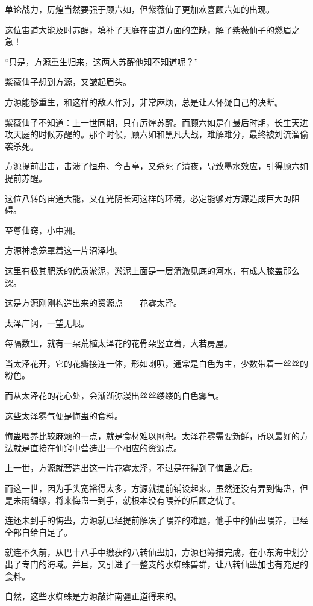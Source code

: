 \begin{this_body}
单论战力，厉煌当然要强于顾六如，但紫薇仙子更加欢喜顾六如的出现。

这位宙道大能及时苏醒，填补了天庭在宙道方面的空缺，解了紫薇仙子的燃眉之急！

“只是，方源重生归来，这两人苏醒他知不知道呢？”

紫薇仙子想到方源，又皱起眉头。

方源能够重生，和这样的敌人作对，非常麻烦，总是让人怀疑自己的决断。

紫薇仙子不知道：上一世同期，只有厉煌苏醒。而顾六如是在最后时期，长生天进攻天庭的时候苏醒的。那个时候，顾六如和黑凡大战，难解难分，最终被刘流溜偷袭杀死。

方源提前出击，击溃了恒舟、今古亭，又杀死了清夜，导致墨水效应，引得顾六如提前苏醒。

这位八转的宙道大能，又在光阴长河这样的环境，必定能够对方源造成巨大的阻碍。

至尊仙窍，小中洲。

方源神念笼罩着这一片沼泽地。

这里有极其肥沃的优质淤泥，淤泥上面是一层清澈见底的河水，有成人膝盖那么深。

这是方源刚刚构造出来的资源点——花雾太泽。

太泽广阔，一望无垠。

每隔数里，就有一朵荒植太泽花的花骨朵竖立着，大若房屋。

当太泽花开，它的花瓣接连一体，形如喇叭，通常是白色为主，少数带着一丝丝的粉色。

而从太泽花的花心处，会渐渐弥漫出丝丝缕缕的白色雾气。

这些太泽雾气便是悔蛊的食料。

悔蛊喂养比较麻烦的一点，就是食材难以囤积。太泽花雾需要新鲜，所以最好的方法就是直接在仙窍中营造出一个相应的资源点。

上一世，方源就营造出这一片花雾太泽，不过是在得到了悔蛊之后。

而这一世，因为手头宽裕得太多，方源就提前铺设起来。虽然还没有弄到悔蛊，但是未雨绸缪，将来悔蛊一到手，就根本没有喂养的后顾之忧了。

连还未到手的悔蛊，方源就已经提前解决了喂养的难题，他手中的仙蛊喂养，已经全部自给自足了。

就连不久前，从巴十八手中缴获的八转仙蛊加，方源也筹措完成，在小东海中划分出了专门的海域。并且，又引进了一整支的水蜘蛛兽群，让八转仙蛊加也有充足的食料。

自然，这些水蜘蛛是方源敲诈南疆正道得来的。


\end{this_body}
